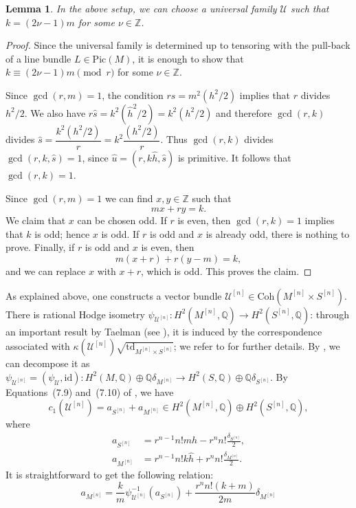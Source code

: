 \documentclass[12pt,a4paper]{amsart}
\theoremstyle{plain}
\newtheorem{lem}[thm]{Lemma}
\theoremstyle{definition}
\theoremstyle{remark}
\def\td{\operatorname{td}}
\def\Pic{\mathrm{Pic}}
\def\Coh{\mathrm{Coh}}
\def\Z{\mathbb{Z}}
\def\QQ{\mathbb{Q}}
\def\U{\mathcal{U}}
\newcommand{\ZZ}{\mathbb{Z}}
\newcommand{\rathodge}[1]{\psi_{#1}}
\begin{document}
\begin{lem}\label{lem_choosek}
    In the above setup, we can choose a universal family $\U$ such that $k=(2\nu-1) m$ for some $\nu\in\Z$.
\end{lem}
\begin{proof}
Since the universal family is determined up to tensoring with the pull-back of a line bundle $L\in \Pic(M)$, it is enough to show that $k\equiv(2\nu-1)m\pmod{r}$ for some $\nu\in\mathbb{Z}$.

Since $\gcd(r,m)=1$, the condition $rs=m^2(h^2/2)$ implies that $r$ divides $h^2/2$. We also have $r\widehat{s}=k^2(\widehat{h}^2/2)=k^2(h^2/2)$ and therefore $\gcd(r,k)$ divides $\widehat{s}=\dfrac{k^2(h^2/2)}{r}=k^2\dfrac{(h^2/2)}{r}$. Thus $\gcd(r,k)$ divides $\gcd(r,k,\widehat{s})=1$, since $\widehat{u}=(r,k\widehat{h},\widehat{s})$ is primitive. It follows that $\gcd(r,k)=1$.

Since $\gcd(r,m)=1$ we can find $x,y\in\ZZ$ such that 
\[
mx+ry=k.
\]
We claim that $x$ can be chosen odd. If $r$ is even, then $\gcd(r,k)=1$ implies that $k$ is odd; hence $x$ is odd. If $r$ is odd and $x$ is already odd, there is nothing to prove. Finally, if $r$ is odd and $x$ is even, then 
\[
m(x+r)+r(y-m)=k,
\]
and we can replace $x$ with $x+r$, which is odd. This proves the claim.
\end{proof}

As explained above, one constructs a vector bundle $\mathcal{U}^{[n]}\in\Coh(M^{[n]}\times S^{[n]})$. There is rational Hodge isometry $\rathodge{\mathcal{U}^{[n]}}:H^2(M^{[n]},\mathbb{Q})\rightarrow H^2(S^{[n]},\mathbb{Q})$: through an important result by Taelman (see \cite{tae23}), it is induced by the correspondence associated with $\kappa(\mathcal{U}^{[n]})\sqrt{\td_{M^{[n]}\times S^{[n]}}}$; we refer to \cite[Section 3.2]{markman} for further details.
By \cite[Section 7]{markman}, we can decompose it as $\rathodge{\mathcal{U}^{[n]}}=(\rathodge{\mathcal{U}},\mathrm{id}):H^2(M,\mathbb{Q})\oplus\QQ\delta_{M^{[n]}}\rightarrow H^2(S,\mathbb{Q})\oplus\QQ\delta_{S^{[n]}}$. By Equations~(7.9) and~(7.10) of \cite{markman}, we have
\begin{equation}
    c_1(\mathcal{U}^{[n]})=a_{S^{[n]}}+a_{M^{[n]}}\in H^2(M^{[n]},\QQ)\oplus H^2(S^{[n]},\QQ),
\end{equation}
where
\begin{align}
    a_{S^{[n]}}&=r^{n-1}n!mh
       - r^n n!\frac{\delta_{S^{[n]}}}{2},\\
    a_{M^{[n]}}&=r^{n-1}n!k\widehat{h}+r^n n!\frac{\delta_{M^{[n]}}}{2}.
\end{align}
It is straightforward to get the following relation:
\begin{equation}\label{eq_identifyingcomponents}
    a_{M^{[n]}}=\frac{k}{m}\rathodge{\mathcal{U}^{[n]}}^{-1}\left(a_{S^{[n]}}\right)+\frac{r^nn!(k+m)}{2m}\delta_{M^{[n]}}
\end{equation}
\end{document}
